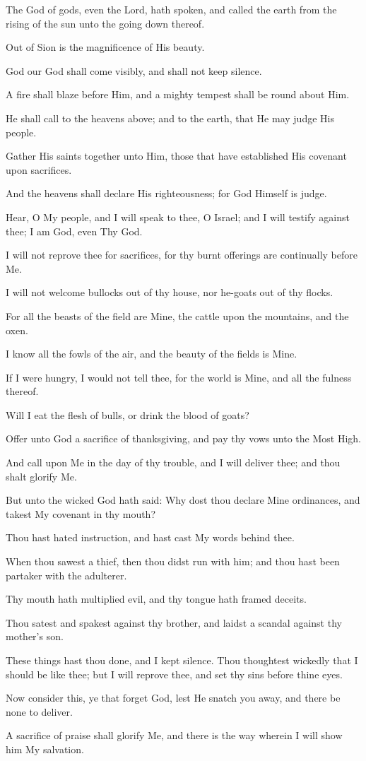 The God of gods, even the Lord, hath spoken, and called the earth from the rising of the sun unto the going down thereof.

Out of Sion is the magnificence of His beauty.

God our God shall come visibly, and shall not keep silence.

A fire shall blaze before Him, and a mighty tempest shall be round about Him.

He shall call to the heavens above; and to the earth, that He may judge His people.

Gather His saints together unto Him, those that have established His covenant upon sacrifices.

And the heavens shall declare His righteousness; for God Himself is judge.

Hear, O My people, and I will speak to thee, O Israel; and I will testify against thee; I am God, even Thy God.

I will not reprove thee for sacrifices, for thy burnt offerings are continually before Me.

I will not welcome bullocks out of thy house, nor he-goats out of thy flocks.

For all the beasts of the field are Mine, the cattle upon the mountains, and the oxen.

I know all the fowls of the air, and the beauty of the fields is
Mine.

If I were hungry, I would not tell thee, for the world is Mine, and all the fulness thereof.

Will I eat the flesh of bulls, or drink the blood of goats?

Offer unto God a sacrifice of thanksgiving, and pay thy vows unto the Most High.

And call upon Me in the day of thy trouble, and I will deliver thee; and thou shalt glorify Me.

But unto the wicked God hath said: Why dost thou declare Mine ordinances, and takest My covenant in thy mouth?

Thou hast hated instruction, and hast cast My words behind thee.

When thou sawest a thief, then thou didst run with him; and thou hast been partaker with the adulterer.

Thy mouth hath multiplied evil, and thy tongue hath framed deceits.

Thou satest and spakest against thy brother, and laidst a scandal against thy mother's son.

These things hast thou done, and I kept silence. Thou thoughtest wickedly that I should be like thee; but I will reprove thee, and set thy sins before thine eyes.

Now consider this, ye that forget God, lest He snatch you away, and there be none to deliver.

A sacrifice of praise shall glorify Me, and there is the way wherein I will show him My salvation.
